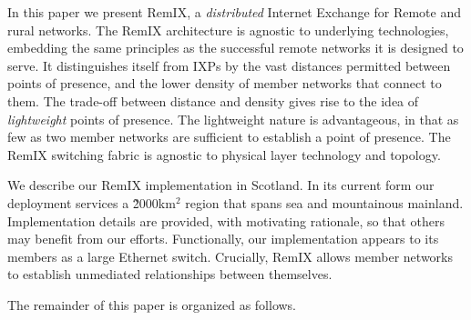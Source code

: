 In this paper we present RemIX, a \emph{distributed} Internet Exchange for
Remote and rural networks. The RemIX architecture is agnostic to underlying
technologies, embedding the same principles as the successful remote networks it
is designed to serve. It distinguishes itself from \acp{IXP} by the vast
distances permitted between points of presence, and the lower density of member
networks that connect to them. The trade-off between distance and density gives
rise to the idea of \emph{lightweight} points of presence. The lightweight
nature is advantageous, in that as few as two member networks are sufficient to
establish a point of presence. The RemIX switching fabric is agnostic to
physical layer technology and topology.

We describe our RemIX implementation in Scotland. In its current form our
deployment services a \~2000km$^2$ region that spans sea and mountainous
mainland. Implementation details are provided, with motivating rationale, so
that others may benefit from our efforts. Functionally, our implementation
appears to its members as a large Ethernet switch. Crucially, RemIX allows
member networks to establish unmediated relationships between themselves.

The remainder of this paper is organized as follows. 
